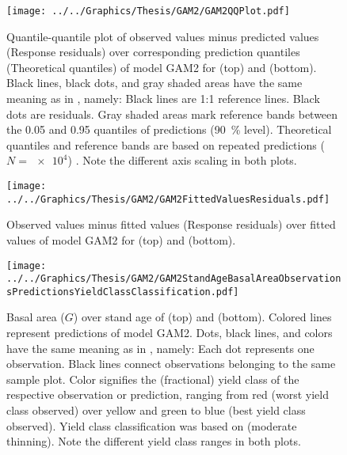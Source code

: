 \begin{figure}[h]
  \centering
  \texttt{[image: ../../Graphics/Thesis/GAM2/GAM2QQPlot.pdf]}
  \caption{Quantile-quantile plot of observed values minus predicted values (Response residuals) over corresponding prediction quantiles (Theoretical quantiles) of model GAM2 for \Beech{} (top) and \Spruce{} (bottom).  Black lines, black dots, and gray shaded areas have the same meaning as in , namely:  Black lines are 1:1 reference lines.  Black dots are residuals.  Gray shaded areas mark reference bands between the \num{0.05} and \num{0.95} quantiles of predictions (\SI{90}{\percent} level).  Theoretical quantiles and reference bands are based on repeated predictions (\(N = \num{e4}\)) \parencite{Augustin2012}.  Note the different axis scaling in both plots.}
  \label{fig:GAM2QQPlot}
\end{figure}

\begin{figure}[h]
  \centering
  \texttt{[image: ../../Graphics/Thesis/GAM2/GAM2FittedValuesResiduals.pdf]}
  \caption{Observed values minus fitted values (Response residuals) over fitted values of model GAM2 for \Beech{} (top) and \Spruce{} (bottom).}
  \label{fig:GAM2FittedValuesResiduals}
\end{figure}

\begin{figure}[h]
  \centering
  \texttt{[image: ../../Graphics/Thesis/GAM2/GAM2StandAgeBasalAreaObservationsPredictionsYieldClassClassification.pdf]}
  \caption{Basal area (\(G\)) over stand age of \Beech{} (top) and \Spruce{} (bottom).  Colored lines represent predictions of model GAM2.  Dots, black lines, and colors have the same meaning as in , namely:  Each dot represents one observation.  Black lines connect observations belonging to the same sample plot.  Color signifies the (fractional) yield class of the respective observation or prediction, ranging from red (worst yield class observed) over yellow and green to blue (best yield class observed). Yield class classification was based on \textcite{Schober1995} (moderate thinning).  Note the different yield class ranges in both plots.}
  \label{fig:GAM2StandAgeBasalAreaObservationsPredictionsYieldClassClassification}
\end{figure}

